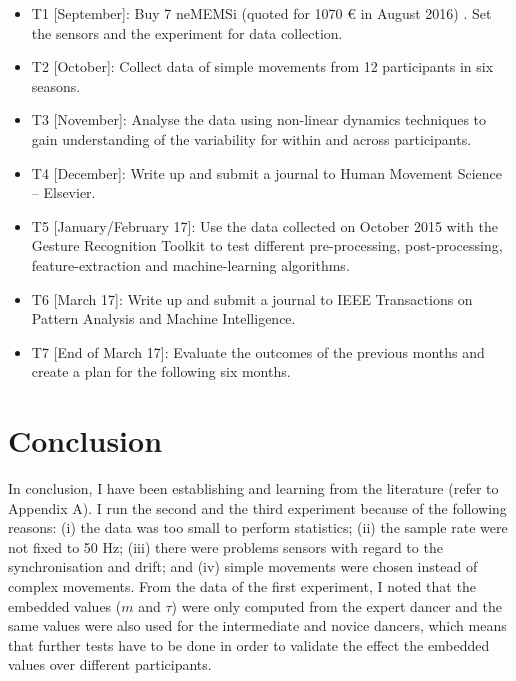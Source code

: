 \documentclass[9pt,journal,onecolumn,compsoc]{IEEEtran}
\begin{document}
\begin{itemize}
\item T1 [September]: Buy 7 neMEMSi (quoted for 1070 \euro{} in August 2016) \cite{neMEMSi2016}. 
Set the sensors and the experiment  for data collection. 

\item T2 [October]: Collect data of simple movements from 12 participants in six seasons. 

\item T3 [November]: Analyse the data using non-linear dynamics techniques to gain understanding of the 
variability for within and across participants.

\item T4 [December]: Write up and submit a journal to Human Movement Science -- Elsevier.

\item T5 [January/February 17]: 
Use the data collected on October 2015 with the Gesture Recognition Toolkit 
to test different pre-processing, post-processing, feature-extraction and machine-learning algorithms.

\item T6 [March 17]: Write up and submit a journal to IEEE Transactions on Pattern Analysis and Machine Intelligence.

\item T7 [End of March 17]: Evaluate the outcomes of the previous months and create a plan for the following six months.



\end{itemize}


\section{Conclusion}
In conclusion, I have been establishing and learning 
from the literature (refer to Appendix A). I run the second and the third experiment
because of the following reasons: 
(i) the data was too small to perform statistics; 
(ii) the sample rate were not fixed to 50 Hz;
(iii) there were problems sensors with regard to the synchronisation and drift; and 
(iv) simple movements were chosen instead of complex movements.
From the data of the first experiment, I noted that the embedded values ($m$ and $\tau$) were 
only computed from the expert dancer and the same values were also used for 
the intermediate and novice dancers, which means that further tests have to be done in order to validate the 
effect the embedded values over different participants.
\end{document}
